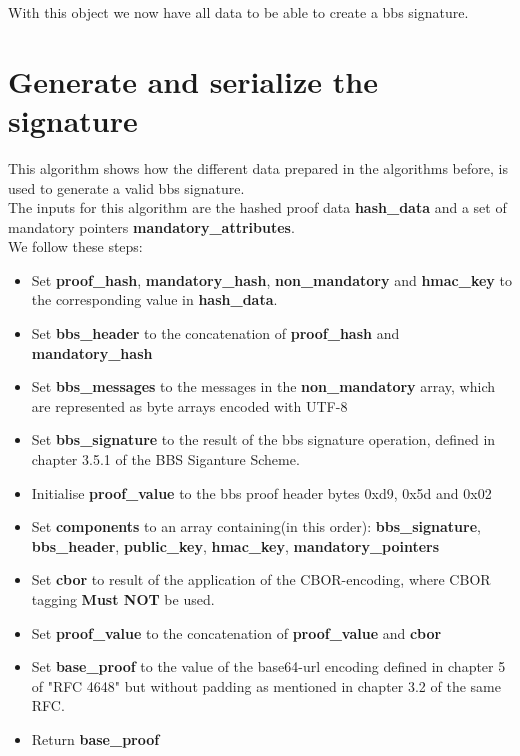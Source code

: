 \documentclass[
	a4paper               %
	,bibliography=totoc   %
	,listof=totoc         %
	,monolingual
]{bfhthesis}              %
\begin{document}
With this object we now have all data to be able to create a bbs signature.

\section{Generate and serialize the signature}
\label{subsubsec:sign}
This algorithm shows how the different data prepared in the algorithms before, is used to generate a valid bbs signature.\\

The inputs for this algorithm are the hashed proof data \textbf{hash\_data} and a set of mandatory pointers \textbf{mandatory\_attributes}.\\

We follow these steps:
\begin{itemize}
	\item Set \textbf{proof\_hash}, \textbf{mandatory\_hash}, \textbf{non\_mandatory} and \textbf{hmac\_key} to the corresponding value in \textbf{hash\_data}.
	\item Set \textbf{bbs\_header} to the concatenation of \textbf{proof\_hash} and \textbf{mandatory\_hash}
	\item Set \textbf{bbs\_messages} to the messages in the \textbf{non\_mandatory} array, which are represented as byte arrays encoded with UTF-8
	\item Set \textbf{bbs\_signature} to the result of the bbs signature operation, defined in chapter 3.5.1 of the BBS Siganture Scheme\cite{bbs-signature-scheme}.
	\item Initialise \textbf{proof\_value} to the bbs proof header bytes 0xd9, 0x5d and 0x02
	\item Set \textbf{components} to an array containing(in this order): \textbf{bbs\_signature}, \textbf{bbs\_header}, \textbf{public\_key}, \textbf{hmac\_key}, \textbf{mandatory\_pointers}
	\item Set \textbf{cbor} to result of the application of the CBOR-encoding\cite{cbor}, where CBOR tagging \textbf{Must NOT} be used.
	\item Set \textbf{proof\_value} to the concatenation of \textbf{proof\_value} and \textbf{cbor}
	\item Set \textbf{base\_proof} to the value of the base64-url encoding defined in chapter 5 of "RFC 4648"\cite{base64} but without padding as mentioned in chapter 3.2 of the same RFC.
	\item Return \textbf{base\_proof}
\end{itemize}
\end{document}
